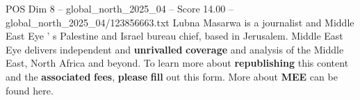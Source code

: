 \begin{textsample}{POS Dim 8 – global\_north\_2025\_04 – Score 14.00 – global\_north\_2025\_04/123856663.txt}
Lubna Masarwa is a journalist and Middle East Eye ' s Palestine and Israel bureau chief, based in Jerusalem.
Middle East Eye delivers independent and \textbf{unrivalled} \textbf{coverage} and analysis of the Middle East, North Africa and beyond.
To learn more about \textbf{republishing} this content and the \textbf{associated} \textbf{fees}, \textbf{please} \textbf{fill} out this form.
More about \textbf{MEE} can be found here.

\end{textsample}
